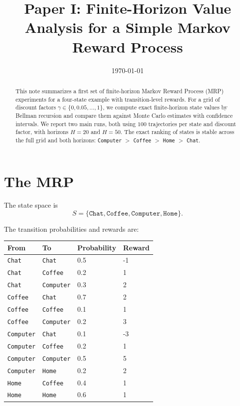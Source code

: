 \documentclass[11pt]{article}
\title{Paper I: Finite-Horizon Value Analysis for a Simple Markov Reward Process}
\author{}
\date{\today}
\begin{document}
\maketitle

\begin{abstract}
This note summarizes a first set of finite-horizon Markov Reward Process (MRP) experiments for a four-state example with transition-level rewards. For a grid of discount factors $\gamma \in \{0, 0.05, \dots, 1\}$, we compute exact finite-horizon state values by Bellman recursion and compare them against Monte Carlo estimates with confidence intervals. We report two main runs, both using $100$ trajectories per state and discount factor, with horizons $H=20$ and $H=50$. The exact ranking of states is stable across the full grid and both horizons: \texttt{Computer} $>$ \texttt{Coffee} $>$ \texttt{Home} $>$ \texttt{Chat}.
\end{abstract}

\section{The MRP}
The state space is
\[
S = \{\texttt{Chat}, \texttt{Coffee}, \texttt{Computer}, \texttt{Home}\}.
\]

The transition probabilities and rewards are:

\begin{center}
\begin{tabular}{llll}
\toprule
From & To & Probability & Reward \\
\midrule
\texttt{Chat} & \texttt{Chat} & 0.5 & -1 \\
\texttt{Chat} & \texttt{Coffee} & 0.2 & 1 \\
\texttt{Chat} & \texttt{Computer} & 0.3 & 2 \\
\texttt{Coffee} & \texttt{Chat} & 0.7 & 2 \\
\texttt{Coffee} & \texttt{Coffee} & 0.1 & 1 \\
\texttt{Coffee} & \texttt{Computer} & 0.2 & 3 \\
\texttt{Computer} & \texttt{Chat} & 0.1 & -3 \\
\texttt{Computer} & \texttt{Coffee} & 0.2 & 1 \\
\texttt{Computer} & \texttt{Computer} & 0.5 & 5 \\
\texttt{Computer} & \texttt{Home} & 0.2 & 2 \\
\texttt{Home} & \texttt{Coffee} & 0.4 & 1 \\
\texttt{Home} & \texttt{Home} & 0.6 & 1 \\
\bottomrule
\end{tabular}
\end{center}
\end{document}
